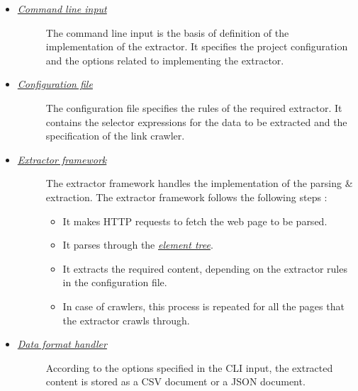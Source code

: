 \documentclass[letterpaper,12pt,english]{sphinxmanual}
\begin{document}
\begin{itemize}
\item {} \begin{description}
\item[{{\hyperref[framework/commands:framework-commands]{\emph{Command line input}}}}] \leavevmode
The command line input is the basis of definition of the implementation of the extractor. It specifies the project configuration and the options related to implementing the extractor.

\end{description}

\item {} \begin{description}
\item[{{\hyperref[framework/config:framework-config]{\emph{Configuration file}}}}] \leavevmode
The configuration file specifies the rules of the required extractor. It contains the selector expressions for the data to be extracted and the specification of the link crawler.

\end{description}

\item {} \begin{description}
\item[{{\hyperref[concepts/selectors:concepts-selectors]{\emph{Extractor framework}}}}] \leavevmode
The extractor framework handles the implementation of the parsing \& extraction. The extractor framework follows the following steps :
\begin{itemize}
\item {} 
It makes HTTP requests to fetch the web page to be parsed.

\item {} 
It parses through the {\hyperref[concepts/structure:concepts-structure]{\emph{element tree}}}.

\item {} 
It extracts the required content, depending on the extractor rules in the configuration file.

\item {} 
In case of crawlers, this process is repeated for all the pages that the extractor crawls through.

\end{itemize}

\end{description}

\item {} \begin{description}
\item[{{\hyperref[concepts/formats:concepts-formats]{\emph{Data format handler}}}}] \leavevmode
According to the options specified in the CLI input, the extracted content is stored as a CSV document or a JSON document.

\end{description}

\end{itemize}
\end{document}
